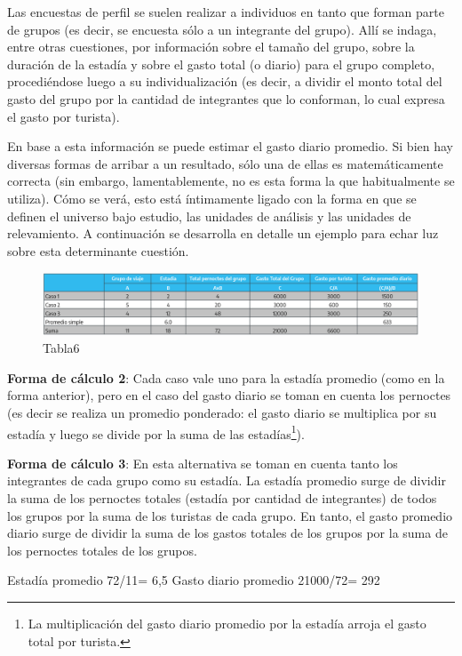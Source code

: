 \documentclass[
]{book}
\begin{document}
Las encuestas de perfil se suelen realizar a individuos en tanto que forman parte de grupos (es decir, se encuesta sólo a un integrante del grupo). Allí se indaga, entre otras cuestiones, por información sobre el tamaño del grupo, sobre la duración de la estadía y sobre el gasto total (o diario) para el grupo completo, procediéndose luego a su individualización (es decir, a dividir el monto total del gasto del grupo por la cantidad de integrantes que lo conforman, lo cual expresa el gasto por turista).

En base a esta información se puede estimar el gasto diario promedio. Si bien hay diversas formas de arribar a un resultado, sólo una de ellas es matemáticamente correcta (sin embargo, lamentablemente, no es esta forma la que habitualmente se utiliza). Cómo se verá, esto está íntimamente ligado con la forma en que se definen el universo bajo estudio, las unidades de análisis y las unidades de relevamiento. A continuación se desarrolla en detalle un ejemplo para echar luz sobre esta determinante cuestión.

\begin{figure}
\includegraphics[width=1\linewidth]{imagenes/tabla_6} \caption{Tabla6}\label{fig:Casos}
\end{figure}

\textbf{Forma de cálculo 2}: Cada caso vale uno para la estadía promedio (como en la forma anterior), pero en el caso del gasto diario se toman en cuenta los pernoctes (es decir se realiza un promedio ponderado: el gasto diario se multiplica por su estadía y luego se divide por la suma de las estadías\footnote{La multiplicación del gasto diario promedio por la estadía arroja el gasto total por turista.}).

\textbf{Forma de cálculo 3}: En esta alternativa se toman en cuenta tanto los integrantes de cada grupo como su estadía. La estadía promedio surge de dividir la suma de los pernoctes totales (estadía por cantidad de integrantes) de todos los grupos por la suma de los turistas de cada grupo. En tanto, el gasto promedio diario surge de dividir la suma de los gastos totales de los grupos por la suma de los pernoctes totales de los grupos.

Estadía promedio 72/11= 6,5 Gasto diario promedio 21000/72= 292
\end{document}
